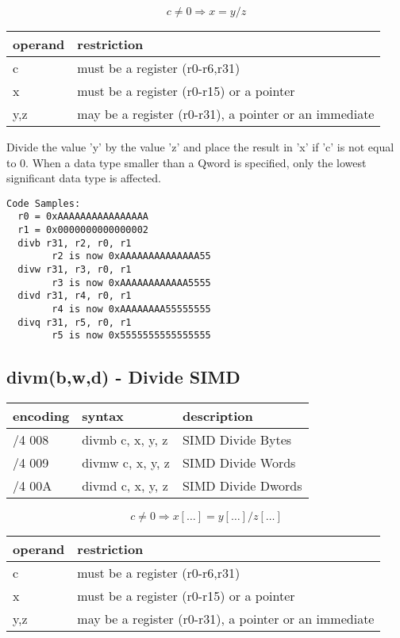 \documentclass[letterpaper,10pt,openright,twoside,onecolumn]{book}
\begin{document}
  \begin{displaymath} c \neq 0 \Rightarrow x = y / z\end{displaymath}

  \flushleft
  \begin{tabular}{|l|l|}
   \hline
    operand & restriction \\
   \hline
    c & must be a register (r0-r6,r31) \\
    x & must be a register (r0-r15) or a pointer \\
    y,z & may be a register (r0-r31), a pointer or an immediate \\
   \hline
  \end{tabular}

  Divide the value 'y' by the value 'z' and place the result in 'x' if 'c' is
  not equal to 0.
  When a data type smaller than a Qword is specified, only the
  lowest significant data type is affected.

  \begin{verbatim}
Code Samples:
  r0 = 0xAAAAAAAAAAAAAAAA
  r1 = 0x0000000000000002
  divb r31, r2, r0, r1
        r2 is now 0xAAAAAAAAAAAAAA55
  divw r31, r3, r0, r1
        r3 is now 0xAAAAAAAAAAAA5555
  divd r31, r4, r0, r1
        r4 is now 0xAAAAAAAA55555555
  divq r31, r5, r0, r1
        r5 is now 0x5555555555555555
  \end{verbatim}
\newpage\subsection{divm(b,w,d) - Divide SIMD}
  \begin{tabular}{|l|l|l|}
   \hline
    encoding & syntax & description \\
   \hline
    /4 008 & divmb c, x, y, z & SIMD Divide Bytes \\
    /4 009 & divmw c, x, y, z & SIMD Divide Words \\
    /4 00A & divmd c, x, y, z & SIMD Divide Dwords \\
   \hline
  \end{tabular}

  \begin{displaymath} c \neq 0 \Rightarrow x[\ldots] = y[\ldots] / z[\ldots]\end{displaymath}

  \flushleft
  \begin{tabular}{|l|l|}
   \hline
    operand & restriction \\
   \hline
    c & must be a register (r0-r6,r31) \\
    x & must be a register (r0-r15) or a pointer \\
    y,z & may be a register (r0-r31), a pointer or an immediate \\
   \hline
  \end{tabular}
\end{document}
